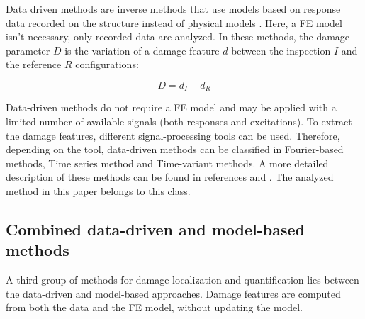 \documentclass[journal]{IEEEtran}
\begin{document}
Data driven methods are inverse methods that use models based on response data recorded on the structure instead of physical models
\cite{limongelli2016towards}.
Here, a FE model isn't necessary, only recorded data are analyzed.
 In these methods, the damage parameter $D$ is the variation of a damage feature $d$ between the inspection $I$ and the reference $R$ configurations: %


\begin{equation}
D=d_{I} - d_{R}
\end{equation}

Data-driven methods do not require a FE model  and may be applied with a limited number of available signals (both responses and excitations).
To extract the damage features, different signal-processing tools can be used. Therefore, depending on the tool,  data-driven methods can be classified in Fourier-based methods, Time series method and Time-variant methods.
A more detailed description of these methods can be found in references %
\cite{fassois2007time} and
\cite{staszewski2007time}.
The analyzed method in this paper belongs to this class.

\subsection{Combined data-driven and model-based methods}

A third group of methods for damage localization and quantification lies between the data-driven and model-based approaches.
Damage features are computed from both the data and the FE model, without updating the model.
\end{document}
